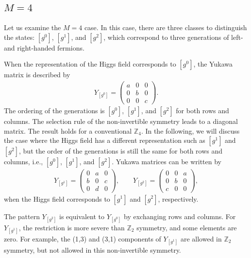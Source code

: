 \documentclass[a4paper,11pt]{article}
\numberwithin{equation}{section}
\begin{document}
\subsection{$M=4$}

Let us examine the $M=4$ case. 
In this case, there are three classes to distinguish the states: $[g^0]$, $[g^1]$, and $[g^2]$, which correspond to three generations of left- and right-handed fermions.  

When the representation of the Higgs field corresponds to $[g^0]$, the Yukawa matrix is described by
\begin{align}
Y_{[g^0]}=
\begin{pmatrix}
a & 0 & 0\\
0 & b & 0 \\
0 & 0 & c
\end{pmatrix}
.
\end{align}
The ordering of the generations is $[g^0]$, $[g^1]$, and $[g^2]$ for both rows and columns. 
The selection rule of the non-invertible symmetry leads to a diagonal matrix.
The result holds for a conventional $\mathbb{Z}_4$. 
In the following, we will discuss the case where the Higgs field has a different representation such as $[g^1]$ and $[g^2]$, but the order of the generations is still the same for both rows and columns, i.e., $[g^0]$, $[g^1]$, and $[g^2]$.
Yukawa matrices can be written by
\begin{align}
Y_{[g^1]}=
\begin{pmatrix}
0 & a & 0\\
b & 0 & c \\
0 & d & 0
\end{pmatrix}
,\qquad
Y_{[g^2]}=
\begin{pmatrix}
0 & 0 & a\\
0 & b & 0 \\
c & 0 & 0
\end{pmatrix},
\end{align}
when the Higgs field corresponds to 
$[g^1]$ and $[g^2]$, respectively.


The pattern $Y_{[g^2]}$ is equivalent to 
$Y_{[g^0]}$ by exchanging rows and columns. 
For $Y_{[g^1]}$, the restriction is more severe than $\mathbb{Z}_2$ symmetry, and some elements are zero.
For example, the (1,3) and (3,1) components of $Y_{[g^1]}$ are allowed in $\mathbb{Z}_2$ symmetry, but not allowed in this non-invertible symmetry.
\end{document}
